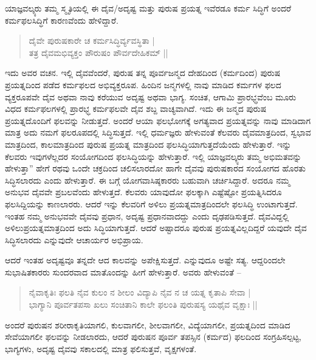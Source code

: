 ಯಾಜ್ಞವಲ್ಕ್ಯರು ತಮ್ಮ ಸ್ಮೃತಿಯಲ್ಲಿ ಈ ದೈವ/ಅದೃಷ್ಟ ಮತ್ತು ಪುರುಷ ಪ್ರಯತ್ನ ಇವೆರಡೂ ಕರ್ಮ ಸಿದ್ಧಿಗೆ ಅಂದರೆ ಕರ್ಮಫಲಸಿದ್ಧಿಗೆ ಕಾರಣವೆಂದು ಹೇಳಿದ್ದಾರೆ.
\begin{verse}
ದೈವೇ ಪುರುಷಕಾರೇ ಚ ಕರ್ಮಸಿದ್ಧಿರ್ವ್ಯವಸ್ಥಿತಾ |\\
ತತ್ರ ದೈವಮಭಿವ್ಯಕ್ತಂ ಪೌರುಷಂ ಪೌರ್ವದೇಹಿಕಮ್ ||
\end{verse}
ಇದು ಅವರ ವಚನ. ಇಲ್ಲಿ ದೈವವೆಂದರೆ, ಪುರುಷ ತನ್ನ ಪೂರ್ವಜನ್ಮದ ದೇಹದಿಂದ (ಕರ್ಮದಿಂದ) ಪುರುಷ ಪ್ರಯತ್ನದಿಂದ ಪಡೆದ ಕರ್ಮಫಲದ ಅಭಿವ್ಯಕ್ತರೂಪ. ಹಿಂದಿನ ಜನ್ಮಗಳಲ್ಲಿ ನಾವು ಮಾಡಿದ ಕರ್ಮಗಳ ಫಲದ ವ್ಯಕ್ತರೂಪವೇ ದೈವ ಅಥವಾ ನಾವು ಕರೆಯುವ ಅದೃಷ್ಟ ಅಥವಾ ಭಾಗ್ಯ. ಸಂಚಿತ, ಆಗಾಮಿ ಪ್ರಾರಭ್ಧವೆಂಬ ಮೂರು ವಿಧದ ಕರ್ಮಫಲಗಳಲ್ಲಿ ಪ್ರಾರಭ್ಧ ಕರ್ಮಫಲವೇ ದೈವ ಶಬ್ದ ವಾಚ್ಯವಾಗಿದೆ. ಇದು ಈ ಜನ್ಮದ ಪುರುಷ ಪ್ರಯತ್ನದೊಂದಿಗೆ ಫಲವನ್ನು ನೀಡುತ್ತದೆ. ಅಂದರೆ ಆಯಾ ಫಲಭೋಗಕ್ಕೆ ಅಗತ್ಯವಾದ ಪ್ರಯತ್ನವನ್ನು ನಾವು ಮಾಡಿದಾಗ ಮಾತ್ರ ಅದು ನಮಗೆ ಫಲರೂಪದಲ್ಲಿ ಸಿದ್ಧಿಸುತ್ತದೆ. ಇಲ್ಲಿ ಧರ್ಮಜ್ಞರು ಹೇಳುವಂತೆ ಕೆಲವರು ದೈವಮಾತ್ರದಿಂದ, ಸ್ವಭಾವ ಮಾತ್ರದಿಂದ, ಕಾಲಮಾತ್ರದಿಂದ ಪುರುಷ ಪ್ರಯತ್ನ ಮಾತ್ರದಿಂದ ಫಲಸಿದ್ಧಿಯಾಗುತ್ತದೆಯೆಂದು ಹೇಳುತ್ತಾರೆ. ಇನ್ನು ಕೆಲವರು ಇವುಗಳೆಲ್ಲದರ ಸಂಯೋಗದಿಂದ ಫಲಸಿದ್ಧಿಯನ್ನು ಹೇಳುತ್ತಾರೆ. ಇಲ್ಲಿ ಯಾಜ್ಞವಲ್ಕ್ಯರು ತಮ್ಮ ಅಭಿಮತವನ್ನು ಹೇಳುತ್ತಾ” ಹೇಗೆ ರಥವು ಒಂದೇ ಚಕ್ರದಿಂದ ಚಲಿಸಲಾರದೋ ಹಾಗೇ ದೈವವು ಪುರುಷಕಾರದ ಸಂಯೋಗದ ಹೊರತು ಸಿದ್ಧಿಸಲಾರದು ಎಂದು ಹೇಳುತ್ತಾರೆ. ಈ ಬಗ್ಗೆ ಯೋಗವಾಸಿಷ್ಠಕಾರರು ಬಹುವಾಗಿ ಚರ್ಚಿಸಿದ್ದಾರೆ. ಅದರೂ ನಮ್ಮ ಅನುಭವ ದೈವವೇ ಪ್ರಬಲವೆಂದು ಹೇಳುತ್ತದೆ. ಕೆಲವರು ಯಾವುದೋ ಫಲಕ್ಕಾಗಿ ಎಷ್ಟೆಷ್ಟೋ ಪ್ರಯತ್ನಿಸಿದರೂ ಫಲಸಿದ್ದಿಯನ್ನು ಕಾಣಲಾರರು. ಆದರೆ ಇನ್ನು ಕೆಲವರಿಗೆ ಅಳಿಲು ಪ್ರಯತ್ನಮಾತ್ರದಿಂದಲೇ ಫಲಸಿದ್ಧಿ ಉಂಟಾಗುತ್ತದೆ. ಇಂತಹ ನಮ್ಮ ಅನುಭವವೇ ದೈವವು ಪ್ರಧಾನ, ಅದೃಷ್ಟ ಪ್ರಧಾನವಾದದ್ದು ಎಂದು ದೃಢಪಡಿಸುತ್ತದೆ. ದೈವವಿದ್ದಲ್ಲಿ ಅಳಿಲುಪ್ರಯತ್ನಮಾತ್ರದಿಂದ ಅದು ಸಿದ್ಧಿಯಾಗುತ್ತದೆ. ಆದರೆ ಅಷ್ಟಾದರೂ ಪುರುಷ ಪ್ರಯತ್ನವಿಲ್ಲದಿದ್ದರೆ ಯವುದೇ ದೈವ ಸಿದ್ಧಿಸಲಾರದು ಎನ್ನುವುದೇ ಆಚಾರ್ಯರ ಅಭಿಪ್ರಾಯ. 

ಆದರೆ ಇಂತಹ ಅದೃಷ್ಟವೂ ತನ್ನದೇ ಆದ ಕಾಲವನ್ನು ಅಪೇಕ್ಷಿಸುತ್ತದೆ. ಎನ್ನುವುದೂ ಅಷ್ಟೇ ಸತ್ಯ. ಆದ್ದರಿಂದಲೇ ಸುಭಾಷಿತಕಾರರು ಸುಂದರವಾದ ಮಾತೊಂದನ್ನು ಹೀಗೆ ಹೇಳುತ್ತಾರೆ. ಅವರು ಹೇಳುವಂತೆ --
\begin{verse}
ನೈವಾಕೃತಿಃ ಫಲತಿ ನೈವ ಕುಲಂ ನ ಶೀಲಂ ವಿದ್ಯಾಪಿ ನೈವ ನ ಚ ಯತ್ನ ಕೃತಾಪಿ ಸೇವಾ |\\
ಭಾಗ್ಯಾನಿ ಪೂರ್ವತಪಸಾ ಖಲು ಸಂಚಿತಾನಿ ಕಾಲೇ ಫಲಂತಿ ಪುರುಷಸ್ಯ ಯಥೈವ ವೃಕ್ಷಾಃ ||
\end{verse}
ಅಂದರೆ ಪುರುಷನ ಶರೀರಾಕೃತಿಯಾಗಲಿ, ಕುಲವಾಗಲೀ, ಶೀಲವಾಗಲೀ, ವಿದ್ಯೆಯಾಗಲೀ, ಪ್ರಯತ್ನದಿಂದ ಮಾಡಿದ ಸೇವೆಯಾಗಲೀ ಫಲವನ್ನು ನೀಡಲಾರದು, ಆದರೆ ಪುರುಷನ ಪೂರ್ವ ತಪಸ್ಸಿನ (ಕರ್ಮದ) ಫಲದಿಂದ ಸಂಗ್ರಹಿಸಲ್ಪಟ್ಟ, ಭಾಗ್ಯಗಳು, ಅದೃಷ್ಟ ದೈವವು ಸಕಾಲದಲ್ಲಿ ಮಾತ್ರ ಫಲಿಸುತ್ತವೆ, ವೃಕ್ಷಗಳಂತೆ. 

